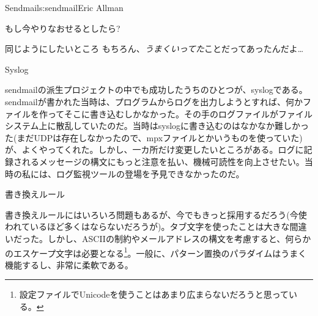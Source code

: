\begin{aosachapter}{Sendmail}{s:sendmail}{Eric Allman}
\begin{aosasect1}{もし今やりなおせるとしたら?}
\begin{aosasect2}{同じようにしたいところ}
もちろん、\emph{うまくいってた}ことだってあったんだよ\ldots

\begin{aosasect3}{Syslog}

sendmailの派生プロジェクトの中でも成功したうちのひとつが、syslogである。sendmailが書かれた当時は、プログラムからログを出力しようとすれば、何かファイルを作ってそこに書き込むしかなかった。その手のログファイルがファイルシステム上に散乱していたのだ。当時はsyslogに書き込むのはなかなか難しかった(まだUDPは存在しなかったので、mpxファイルとかいうものを使っていた)が、よくやってくれた。しかし、一カ所だけ変更したいところがある。ログに記録されるメッセージの構文にもっと注意を払い、機械可読性を向上させたい。当時の私には、ログ監視ツールの登場を予見できなかったのだ。

\end{aosasect3}

\begin{aosasect3}{書き換えルール}

書き換えルールにはいろいろ問題もあるが、今でもきっと採用するだろう(今使われているほど多くはならないだろうが)。タブ文字を使ったことは大きな間違いだった。しかし、ASCIIの制約やメールアドレスの構文を考慮すると、何らかのエスケープ文字は必要となる\footnote{設定ファイルでUnicodeを使うことはあまり広まらないだろうと思っている。}。一般に、パターン置換のパラダイムはうまく機能するし、非常に柔軟である。


\end{aosasect3}
\end{aosasect2}
\end{aosasect1}
\end{aosachapter}
